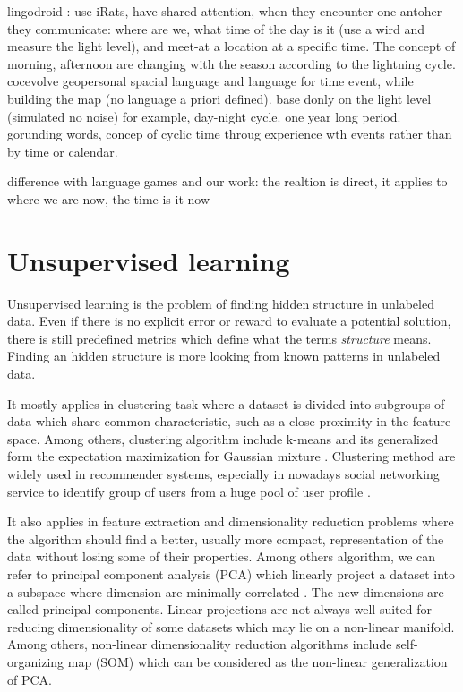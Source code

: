 lingodroid \cite{schulz2010robots} : use iRats, have shared attention, when they encounter one antoher they communicate: where are we, what time of the day is it (use a wird and measure the light level), and meet-at a location at a specific time. The concept of morning, afternoon are changing with the season according to the lightning cycle. \cite{schulz2011lingodroids}
\cite{heath2012long} cocevolve geopersonal spacial language and language for time event, while building the map (no language a priori defined). base donly on the light level (simulated no noise) for example, day-night cycle. one year long period. gorunding words, concep of cyclic time throug experience wth events rather than by time or calendar.


difference with language games and our work: the realtion is direct, it applies to where we are now, the time is it now


\section{Unsupervised learning}

Unsupervised learning is the problem of finding hidden structure in unlabeled data. Even if there is no explicit error or reward to evaluate a potential solution, there is still predefined metrics which define what the terms \emph{structure} means. Finding an hidden structure is more looking from known patterns in unlabeled data.

It mostly applies in clustering task where a dataset is divided into subgroups of data which share common characteristic, such as a close proximity in the feature space. Among others, clustering algorithm include k-means and its generalized form the expectation maximization for Gaussian mixture \cite{dempster1977maximum}. Clustering method are widely used in recommender systems, especially in nowadays social networking service to identify group of users from a huge pool of user profile \cite{sarwar2002recommender}.

It also applies in feature extraction and dimensionality reduction problems where the algorithm should find a better, usually more compact, representation of the data without losing some of their properties. Among others algorithm, we can refer to principal component analysis (PCA) which linearly project a dataset into a subspace where dimension are minimally correlated \cite{jolliffe2005principal}. The new dimensions are called principal components. Linear projections are not always well suited for reducing dimensionality of some datasets which may lie on a non-linear manifold. Among others, non-linear dimensionality reduction algorithms include self-organizing map (SOM) \cite{kohonen2001self} which can be considered as the non-linear generalization of PCA.




